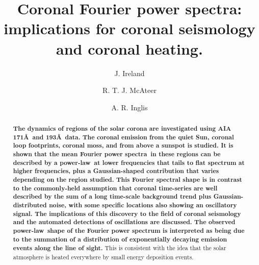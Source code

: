 \documentclass[preprint]{aastex}
\newcommand{\PA}{power spectra}
\newcommand{\PL}{power-law}
\newcommand{\mFpa}{mean Fourier \PA}
\begin{document}

\title{Coronal Fourier power spectra: implications for coronal
  seismology and coronal heating.}


\author{J. Ireland}

\author{R. T. J. McAteer}

\author{A. R. Inglis}


\begin{abstract}

  {\bf The dynamics of regions of the solar corona are investigated
    using AIA 171\AA\ and 193\AA\ data.  The coronal emission from the
    quiet Sun, coronal loop footprints, coronal moss, and from above a
    sunspot is studied.  It is shown that the \mFpa\ in these regions
    can be described by a \PL\ at lower frequencies that tails to
    flat spectrum at higher frequencies, plus a Gaussian-shaped
    contribution that varies depending on the region studied. This
    Fourier spectral shape is in contrast to the commonly-held
    assumption that coronal time-series are well described by the sum
    of a long time-scale background trend plus Gaussian-distributed
    noise, with some specific locations also showing an oscillatory
    signal.  The implications of this discovery to the field of
    coronal seismology and the automated detections of oscillations
    are discussed.  The observed \PL\ shape of the Fourier power
    spectrum is interpreted as being due to the summation of a
    distribution of exponentially decaying emission events along the
    line of sight.}  This is consistent with the idea that the solar
  atmosphere is heated everywhere by small energy deposition events.
\end{abstract}
\end{document}
